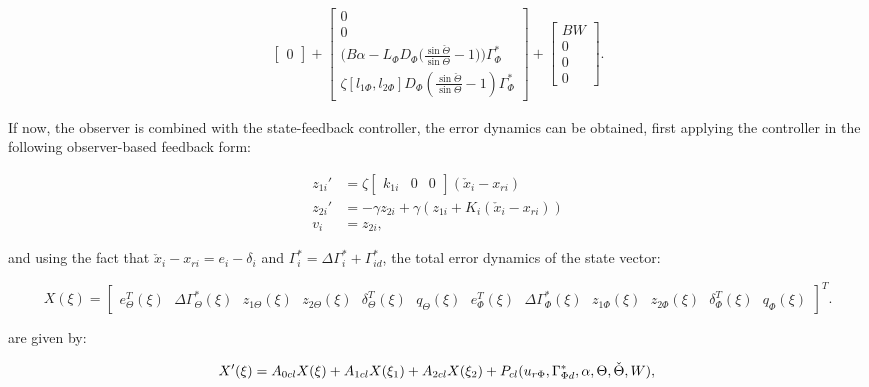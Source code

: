 \documentclass[main.tex]{subfiles}
\begin{document}
\begin{align}
\begin{bmatrix}
	0
	\end{bmatrix}
	+
	\begin{bmatrix}
	0\\
	0 \\
	 \big(B\alpha  - L_\Phi D_\Phi\big(\frac{\sin \check{\Theta}}{\sin \Theta} - 1\big)\big)\Gamma_\Phi^*\\
	\zeta[l_{1\Phi},l_{2\Phi}]D_\Phi (\frac{\sin \check{\Theta}}{\sin \Theta} - 1)\Gamma_\Phi^*
	\end{bmatrix} + 
	 \begin{bmatrix}
	 BW \\
	 0 \\
	 0 \\
	 0
	 \end{bmatrix}.
	\end{align}
	
	If now, the observer is combined with the state-feedback controller, the error dynamics can be obtained, first applying the controller in the following observer-based feedback form:
	
		\begin{align}
		z_{1i}' &= \zeta \begin{bmatrix}
		k_{1i} & 0 & 0
		\end{bmatrix}(\check{x}_i - x_{ri}) \\
		z_{2i}' &= -\gamma z_{2i}  + \gamma (z_{1i} + K_i(\check{x}_i - x_{ri}))\\
		v_i &= z_{2i},
		\end{align}
	
	and using the fact that $\check{x}_i - x_{ri} = e_i - \delta_i$ and $\Gamma_i^* = \Delta \Gamma_i^* + \Gamma_{id}^*$, the total error dynamics of the state vector:
	
	\begin{equation}
	X(\xi) = \begin{bmatrix} 
	e_{\Theta}^T(\xi) \text{ }\Delta \Gamma_\Theta^{*}(\xi) \text{ }z_{1\Theta}(\xi) \text{ } z_{2\Theta}(\xi) \text{ }\delta_{\Theta}^T(\xi) \text{ } q_\Theta(\xi) \text{ }e_{\Phi}^T(\xi) \text{ }\Delta \Gamma_\Phi^*(\xi) \text{ }z_{1\Phi}(\xi) \text{ }z_{2\Phi}(\xi) \text{ }\delta_{\Phi}^T(\xi) \text{ }q_\Phi(\xi)  \nonumber
	\end{bmatrix}^T.
	\end{equation}
	
	are given by:
	
	\begin{equation}
	X'(\xi) =	A_{0cl}X(\xi) + A_{1cl}X(\xi_1) + A_{2cl} X(\xi_2) + P_{cl}(u_{r\Phi},\Gamma_{\Phi d}^*,\alpha, \Theta,\check{\Theta},W),\\
	\label{eq:totaldynamics}
	\end{equation}	
	
\end{document}
